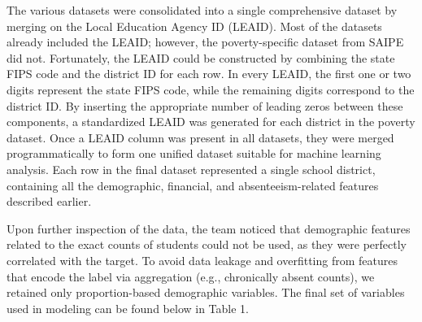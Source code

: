 \documentclass[
  11pt,
]{article}
\begin{document}
The various datasets were consolidated into a single comprehensive
dataset by merging on the Local Education Agency ID (LEAID). Most of the
datasets already included the LEAID; however, the poverty-specific
dataset from SAIPE did not. Fortunately, the LEAID could be constructed
by combining the state FIPS code and the district ID for each row. In
every LEAID, the first one or two digits represent the state FIPS code,
while the remaining digits correspond to the district ID. By inserting
the appropriate number of leading zeros between these components, a
standardized LEAID was generated for each district in the poverty
dataset. Once a LEAID column was present in all datasets, they were
merged programmatically to form one unified dataset suitable for machine
learning analysis. Each row in the final dataset represented a single
school district, containing all the demographic, financial, and
absenteeism-related features described earlier.

Upon further inspection of the data, the team noticed that demographic
features related to the exact counts of students could not be used, as
they were perfectly correlated with the target. To avoid data leakage
and overfitting from features that encode the label via aggregation
(e.g., chronically absent counts), we retained only proportion-based
demographic variables. The final set of variables used in modeling can
be found below in Table 1.

\begingroup
\small
\end{document}
